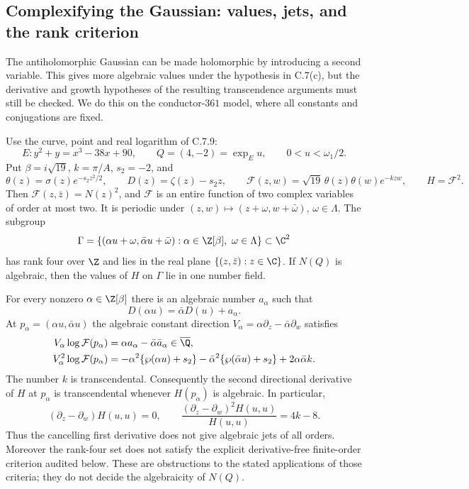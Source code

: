 \subsection{Complexifying the Gaussian: values, jets, and the rank criterion}

The antiholomorphic Gaussian can be made holomorphic by introducing a
second variable. This gives more algebraic values under the hypothesis
in C.7(c), but the derivative and growth hypotheses of the resulting
transcendence arguments must still be checked. We do this on the
conductor-$361$ model, where all constants and conjugations are fixed.

\begin{proposition}\label{ari:C.7.11}
Use the curve, point and real logarithm of C.7.9:
\[
 E:y^2+y=x^3-38x+90,\qquad Q=(4,-2)=\exp_Eu,
 \qquad 0<u<\omega_1/2.
\]
Put $\beta=i\sqrt{19}$, $k=\pi/A$, $s_2=-2$, and
\[
 \theta(z)=\sigma(z)e^{-s_2z^2/2},\qquad
 D(z)=\zeta(z)-s_2z,\qquad
 \mathcal F(z,w)=\sqrt{19}\,\theta(z)\theta(w)e^{-kzw},
 \qquad H=\mathcal F^2.
\]
Then $\mathcal F(z,\bar z)=N(z)^2$, and $\mathcal F$ is an
entire function of two complex variables of order at most two.
It is periodic under $(z,w)\mapsto(z+\omega,w+\bar\omega)$,
$\omega\in\Lambda$. The subgroup
\[
 \Gamma=\{(\alpha u+\omega,\bar\alpha u+\bar\omega):
                   \alpha\in\Z[\beta],\ \omega\in\Lambda\}
 \subset\C^2
\]
has rank four over $\Z$ and lies in the real plane
$\{(z,\bar z):z\in\C\}$. If $N(Q)$ is algebraic, then the
values of $H$ on $\Gamma$ lie in one number field.

For every nonzero $\alpha\in\Z[\beta]$ there is an algebraic
number $a_\alpha$ such that
\[
 D(\alpha u)=\bar\alpha D(u)+a_\alpha.
\]
At $p_\alpha=(\alpha u,\bar\alpha u)$ the algebraic constant
direction $V_\alpha=\alpha\partial_z-\bar\alpha\partial_w$
satisfies
\begin{align*}
 V_\alpha\log\mathcal F(p_\alpha)
    &=\alpha a_\alpha-\bar\alpha\bar a_\alpha
                         \in\overline{\Q},\\
 V_\alpha^2\log\mathcal F(p_\alpha)
    &=-\alpha^2\{\wp(\alpha u)+s_2\}
      -\bar\alpha^2\{\wp(\bar\alpha u)+s_2\}
      +2\alpha\bar\alpha k.
\end{align*}
The number $k$ is transcendental. Consequently the second
directional derivative of $H$ at $p_\alpha$ is transcendental
whenever $H(p_\alpha)$ is algebraic. In particular,
\[
 (\partial_z-\partial_w)H(u,u)=0,\qquad
 \frac{(\partial_z-\partial_w)^2H(u,u)}{H(u,u)}=4k-8.
\]
Thus the cancelling first derivative does not give algebraic jets
of all orders. Moreover the rank-four set does not satisfy the
explicit derivative-free finite-order criterion audited below.
These are obstructions to the stated applications of those
criteria; they do not decide the algebraicity of $N(Q)$.
\end{proposition}


